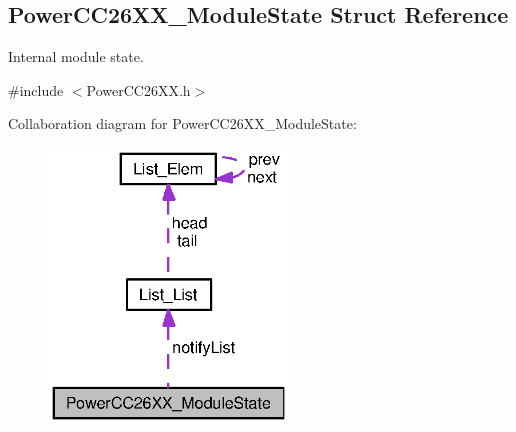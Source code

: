 \subsection{Power\+C\+C26\+X\+X\+\_\+\+Module\+State Struct Reference}
\label{struct_power_c_c26_x_x___module_state}


Internal module state.  




{\ttfamily \#include $<$Power\+C\+C26\+X\+X.\+h$>$}



Collaboration diagram for Power\+C\+C26\+X\+X\+\_\+\+Module\+State\+:
\nopagebreak
\begin{figure}[H]
\begin{center}
\leavevmode
\includegraphics[width=181pt]{struct_power_c_c26_x_x___module_state__coll__graph}
\end{center}
\end{figure}
